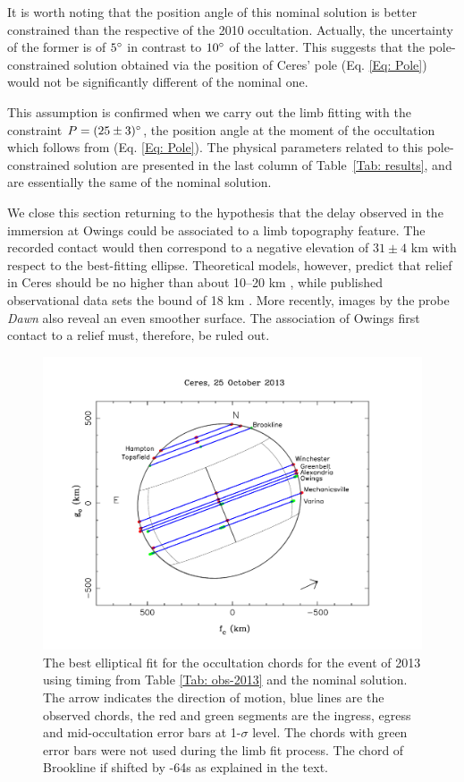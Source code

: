 \documentclass[useAMS,usenatbib]{mn2e}
\begin{document}
It is worth noting that the position angle of this nominal solution is better constrained than the respective of the 2010 occultation. Actually, the uncertainty of the former is of $5\hbox{$^\circ$}$ in contrast to $10\hbox{$^\circ$}$ of the latter. This suggests that the pole-constrained solution obtained via the position of Ceres' pole (Eq. \ref{Eq: Pole}) would not be significantly different of the nominal one.

This assumption is confirmed when we carry out the limb fitting with the constraint $P = (25 \pm 3)\hbox{$^\circ$}$, the position angle at the moment of the occultation which follows from (Eq. \ref{Eq: Pole}). The physical parameters related to this pole-constrained solution are presented in the last column of Table~\ref{Tab: results}, and are essentially the same of the nominal solution.

We close this section returning to the hypothesis that the delay observed in the immersion at Owings could be associated to a limb topography feature. The recorded contact would then correspond to a negative elevation of $31 \pm 4$ km with respect to the best-fitting ellipse. Theoretical models, however, predict that relief in Ceres should be no higher than about 10--20 km \citep{Johnson1973}, while published observational data sets the bound of 18 km \citep{Carry2008}. More recently, images by the probe \textit{Dawn} also reveal an even smoother surface. The association of Owings first contact to a relief must, therefore, be ruled out.

\begin{figure}
\includegraphics[scale=0.36]{figures/Ceres_2013_sphere.pdf}
\caption{The best elliptical fit for the occultation chords for the event of 2013 using timing from Table \ref{Tab: obs-2013} and the nominal solution.  The arrow indicates the direction of motion, blue lines are the observed chords, the red and green segments are the ingress, egress and mid-occultation error bars at 1-$\sigma$ level. The chords with green error bars were not used during the limb fit process. The chord of Brookline if shifted by -64s as explained in the text.\label{Fig: Ceres-2013-body}}
\end{figure}
\end{document}
